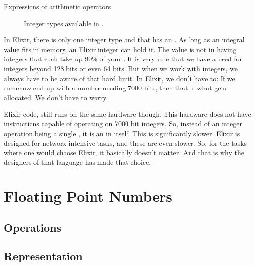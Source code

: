 \begin{syntaxfloat}
  
  \caption{Expressions of arithmetic operators}
  \label{syntax:prim:arithmetic:ops}
\end{syntaxfloat}


\begin{figure}[tbp]
  
  \caption{Integer types available in \csharp.}
  \label{fig:prim:int:csharp:types}
\end{figure}



In Elixir, there is only one integer type and that has an . As long as an integral value fits in memory, an Elixir integer can hold it. The value is not in having integers that each take up 90\% of your . It is very rare that we have a need for integers beyond 128 bits or even 64 bits. But when we work with  integers, we always have to be aware of that hard limit. In Elixir, we don't have to: If we somehow end up with a number needing 7000 bits, then that is what gets allocated. We don't have to worry.

Elixir code, still runs on the same hardware though. This hardware does not have instructions capable of operating on 7000 bit integers. So, instead of an integer operation being a single , it is an  in itself. This is significantly slower. Elixir is designed for network intensive tasks, and these are even slower. So, for the tasks where one would choose Elixir, it basically doesn't matter. And that is why the designers of that language has made that choice.

\section{Floating Point Numbers}
\label{primitives:float}

\subsection{Operations}
\subsection{Representation}
\csharpsubsection{\csharp}

